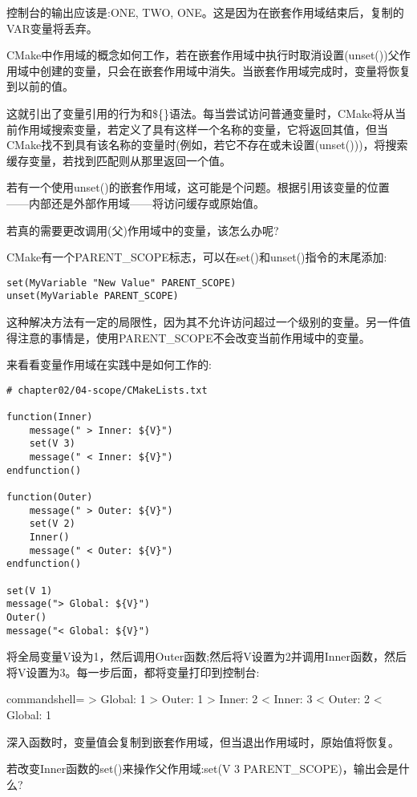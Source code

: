 控制台的输出应该是:ONE, TWO, ONE。这是因为在嵌套作用域结束后，复制的VAR变量将丢弃。

CMake中作用域的概念如何工作，若在嵌套作用域中执行时取消设置(unset())父作用域中创建的变量，只会在嵌套作用域中消失。当嵌套作用域完成时，变量将恢复到以前的值。

这就引出了变量引用的行为和\$\{\}语法。每当尝试访问普通变量时，CMake将从当前作用域搜索变量，若定义了具有这样一个名称的变量，它将返回其值，但当CMake找不到具有该名称的变量时(例如，若它不存在或未设置(unset()))，将搜索缓存变量，若找到匹配则从那里返回一个值。

若有一个使用unset()的嵌套作用域，这可能是个问题。根据引用该变量的位置——内部还是外部作用域——将访问缓存或原始值。

若真的需要更改调用(父)作用域中的变量，该怎么办呢?

CMake有一个PARENT\_SCOPE标志，可以在set()和unset()指令的末尾添加:

\begin{lstlisting}[style=styleCMake]
set(MyVariable "New Value" PARENT_SCOPE)
unset(MyVariable PARENT_SCOPE)
\end{lstlisting}

这种解决方法有一定的局限性，因为其不允许访问超过一个级别的变量。另一件值得注意的事情是，使用PARENT\_SCOPE不会改变当前作用域中的变量。

来看看变量作用域在实践中是如何工作的:

\begin{lstlisting}[style=styleCMake]
# chapter02/04-scope/CMakeLists.txt

function(Inner)
	message(" > Inner: ${V}")
	set(V 3)
	message(" < Inner: ${V}")
endfunction()

function(Outer)
	message(" > Outer: ${V}")
	set(V 2)
	Inner()
	message(" < Outer: ${V}")
endfunction()

set(V 1)
message("> Global: ${V}")
Outer()
message("< Global: ${V}")
\end{lstlisting}

将全局变量V设为1，然后调用Outer函数;然后将V设置为2并调用Inner函数，然后将V设置为3。每一步后面，都将变量打印到控制台:

\begin{tcblisting}{commandshell={}}
> Global: 1
  > Outer: 1
    > Inner: 2
    < Inner: 3
  < Outer: 2
< Global: 1
\end{tcblisting}

深入函数时，变量值会复制到嵌套作用域，但当退出作用域时，原始值将恢复。

若改变Inner函数的set()来操作父作用域:set(V 3 PARENT\_SCOPE)，输出会是什么?


